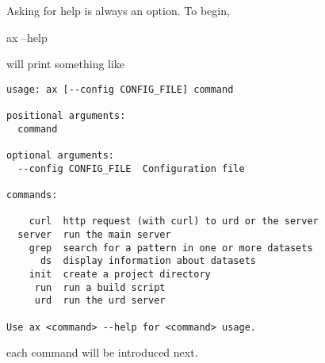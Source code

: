 Asking for help is always an option.  To begin,
\begin{shell}
  ax --help
\end{shell}
will print something like
\begin{snugshade}
\begin{verbatim}
usage: ax [--config CONFIG_FILE] command

positional arguments:
  command

optional arguments:
  --config CONFIG_FILE  Configuration file

commands:

    curl  http request (with curl) to urd or the server
  server  run the main server
    grep  search for a pattern in one or more datasets
      ds  display information about datasets
    init  create a project directory
     run  run a build script
     urd  run the urd server

Use ax <command> --help for <command> usage.
\end{verbatim}
\end{snugshade}
each command will be introduced next.





